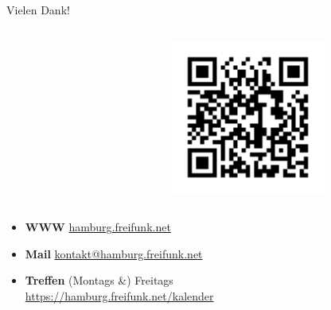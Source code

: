 \documentclass[t]{beamer}
\begin{document}
  \begin{frame}{Vielen Dank!}
    \begin{columns}
      \begin{column}{0.5\textwidth}
        \centering
        
      \end{column}
      
      \begin{column}{0.5\textwidth}
        \centering
        \includegraphics[width=0.65\textwidth]{Bilder/qrcode-2018-11-23}
      \end{column}
    \end{columns}   
    
    \begin{itemize}
      \item \textbf{WWW} \href{https://hamburg.freifunk.net}{hamburg.freifunk.net}
      \item \textbf{Mail} \href{mailto:kontakt@hamburg.freifunk.net}{kontakt@hamburg.freifunk.net}
      \item \textbf{Treffen} (Montags \&) Freitags\\\href{https://hamburg.freifunk.net/kalender}{\small https://hamburg.freifunk.net/kalender}
    \end{itemize}
  \end{frame}
  
\end{document}
